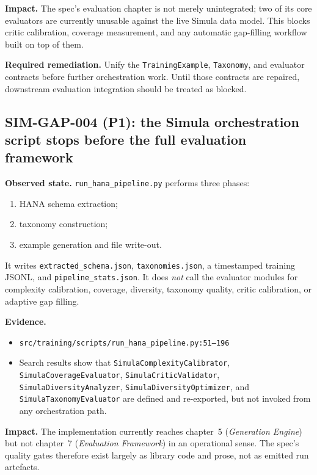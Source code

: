 \textbf{Impact.}
The spec's evaluation chapter is not merely unintegrated; two of its
core evaluators are currently unusable against the live Simula data
model. This blocks critic calibration, coverage measurement, and any
automatic gap-filling workflow built on top of them.

\textbf{Required remediation.}
Unify the \texttt{TrainingExample}, \texttt{Taxonomy}, and evaluator
contracts before further orchestration work. Until those contracts
are repaired, downstream evaluation integration should be treated as
blocked.

\subsection*{SIM-GAP-004 (P1): the Simula orchestration script stops before the full evaluation framework}
\textbf{Observed state.}
\texttt{run\_hana\_pipeline.py} performs three phases:
\begin{enumerate}[label=\arabic*.]
  \item HANA schema extraction;
  \item taxonomy construction;
  \item example generation and file write-out.
\end{enumerate}
It writes \texttt{extracted\_schema.json},
\texttt{taxonomies.json}, a timestamped training JSONL, and
\texttt{pipeline\_stats.json}. It does \emph{not} call the evaluator
modules for complexity calibration, coverage, diversity, taxonomy
quality, critic calibration, or adaptive gap filling.

\textbf{Evidence.}
\begin{itemize}
  \item \texttt{src/training/scripts/run\_hana\_pipeline.py:51--196}
  \item Search results show that
    \texttt{SimulaComplexityCalibrator},
    \texttt{SimulaCoverageEvaluator},
    \texttt{SimulaCriticValidator},
    \texttt{SimulaDiversityAnalyzer},
    \texttt{SimulaDiversityOptimizer}, and
    \texttt{SimulaTaxonomyEvaluator} are defined and re-exported, but
    not invoked from any orchestration path.
\end{itemize}

\textbf{Impact.}
The implementation currently reaches chapter~5
(\emph{Generation Engine}) but not chapter~7
(\emph{Evaluation Framework}) in an operational sense. The spec's
quality gates therefore exist largely as library code and prose, not
as emitted run artefacts.

